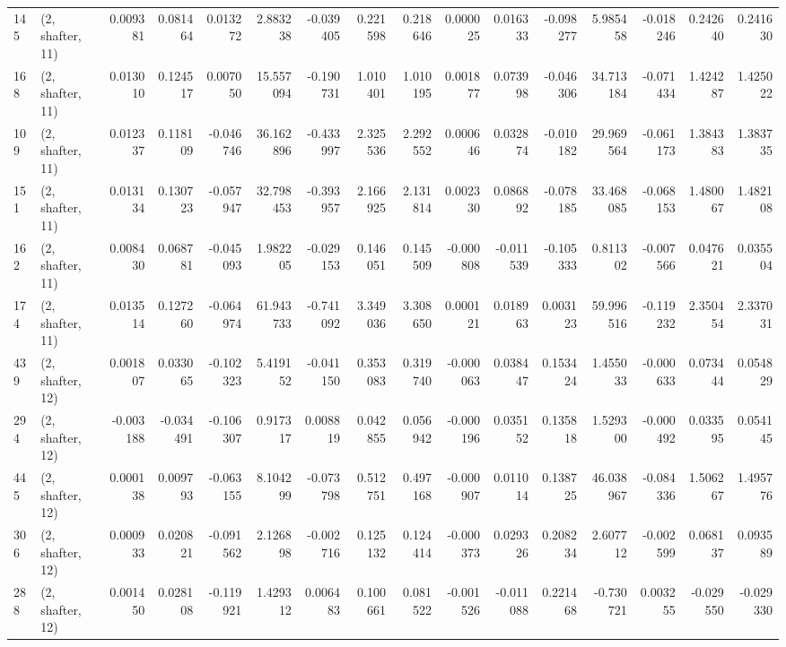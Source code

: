 \begin{tabular}{llrrrrrrrrrrrrrr}
145 &  (2, shafter, 11) &   0.009381 &  0.081464 &  0.013272 &   2.883238 & -0.039405 &   0.221598 &  0.218646 &  0.000025 &  0.016333 & -0.098277 &     5.985458 &  -0.018246 &   0.242640 &   0.241630 \\
168 &  (2, shafter, 11) &   0.013010 &  0.124517 &  0.007050 &  15.557094 & -0.190731 &   1.010401 &  1.010195 &  0.001877 &  0.073998 & -0.046306 &    34.713184 &  -0.071434 &   1.424287 &   1.425022 \\
109 &  (2, shafter, 11) &   0.012337 &  0.118109 & -0.046746 &  36.162896 & -0.433997 &   2.325536 &  2.292552 &  0.000646 &  0.032874 & -0.010182 &    29.969564 &  -0.061173 &   1.384383 &   1.383735 \\
151 &  (2, shafter, 11) &   0.013134 &  0.130723 & -0.057947 &  32.798453 & -0.393957 &   2.166925 &  2.131814 &  0.002330 &  0.086892 & -0.078185 &    33.468085 &  -0.068153 &   1.480067 &   1.482108 \\
162 &  (2, shafter, 11) &   0.008430 &  0.068781 & -0.045093 &   1.982205 & -0.029153 &   0.146051 &  0.145509 & -0.000808 & -0.011539 & -0.105333 &     0.811302 &  -0.007566 &   0.047621 &   0.035504 \\
174 &  (2, shafter, 11) &   0.013514 &  0.127260 & -0.064974 &  61.943733 & -0.741092 &   3.349036 &  3.308650 &  0.000121 &  0.018963 &  0.003123 &    59.996516 &  -0.119232 &   2.350454 &   2.337031 \\
439 &  (2, shafter, 12) &   0.001807 &  0.033065 & -0.102323 &   5.419152 & -0.041150 &   0.353083 &  0.319740 & -0.000063 &  0.038447 &  0.153424 &     1.455033 &  -0.000633 &   0.073444 &   0.054829 \\
294 &  (2, shafter, 12) &  -0.003188 & -0.034491 & -0.106307 &   0.917317 &  0.008819 &   0.042855 &  0.056942 & -0.000196 &  0.035152 &  0.135818 &     1.529300 &  -0.000492 &   0.033595 &   0.054145 \\
445 &  (2, shafter, 12) &   0.000138 &  0.009793 & -0.063155 &   8.104299 & -0.073798 &   0.512751 &  0.497168 & -0.000907 &  0.011014 &  0.138725 &    46.038967 &  -0.084336 &   1.506267 &   1.495776 \\
306 &  (2, shafter, 12) &   0.000933 &  0.020821 & -0.091562 &   2.126898 & -0.002716 &   0.125132 &  0.124414 & -0.000373 &  0.029326 &  0.208234 &     2.607712 &  -0.002599 &   0.068137 &   0.093589 \\
288 &  (2, shafter, 12) &   0.001450 &  0.028108 & -0.119921 &   1.429312 &  0.006483 &   0.100661 &  0.081522 & -0.001526 & -0.011088 &  0.221468 &    -0.730721 &   0.003255 &  -0.029550 &  -0.029330 \\

\end{tabular}
